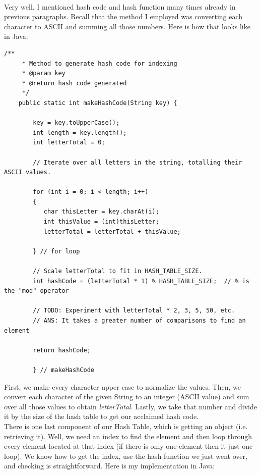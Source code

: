 \documentclass[letterpaper, 10pt]{article}
\begin{document}
\\
Very well. I mentioned hash code and hash function many times already in previous paragraphs. Recall that the method I employed was converting each character to ASCII and summing all those numbers. Here is how that looks like in Java:
\begin{lstlisting}
/**
     * Method to generate hash code for indexing
     * @param key
     * @return hash code generated
     */
    public static int makeHashCode(String key) {
   	 
    	key = key.toUpperCase();
        int length = key.length();
        int letterTotal = 0;

        // Iterate over all letters in the string, totalling their ASCII values.
        
        for (int i = 0; i < length; i++) 
        {	
           char thisLetter = key.charAt(i);
           int thisValue = (int)thisLetter;
           letterTotal = letterTotal + thisValue;
           
        } // for loop

        // Scale letterTotal to fit in HASH_TABLE_SIZE.
        int hashCode = (letterTotal * 1) % HASH_TABLE_SIZE;  // % is the "mod" operator
        
        // TODO: Experiment with letterTotal * 2, 3, 5, 50, etc.
        // ANS: It takes a greater number of comparisons to find an element

        return hashCode;
        
     	} // makeHashCode
\end{lstlisting}
First, we make every character upper case to normalize the values. Then, we convert each character of the given String to an integer (ASCII value) and sum over all those values to obtain \textit{letterTotal}. Lastly, we take that number and divide it by the size of the hash table to get our acclaimed hash code.
\\
There is one last component of our Hash Table, which is getting an object (i.e. retrieving it). Well, we need an index to find the element and then loop through every element located at that index (if there is only one element then it just one loop). We know how to get the index, use the hash function we just went over, and checking is straightforward. Here is my implementation in Java:
\end{document}
